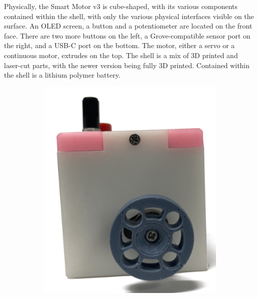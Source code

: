 Physically, the Smart Motor v3 is cube-shaped, with its various components contained within the shell, with only the various physical interfaces visible on the surface. 
An OLED screen, a button and a potentiometer are located on the front face. There are two more buttons on the left, a Grove-compatible sensor port on the right, and a USB-C port on the bottom. The motor, either a servo or a continuous motor, extrudes on the top. The shell is a mix of 3D printed and laser-cut parts, with the newer version being fully 3D printed. Contained within the shell is a lithium polymer battery.

\begin{figure}[H]
    \centering
    \begin{subfigure}[b]{0.25\textwidth}
        \includegraphics[width=\linewidth]{overleaf/images/top.png}
    \end{subfigure}
    \begin{subfigure}[b]{0.25\textwidth}

\end{subfigure}
\end{figure}
